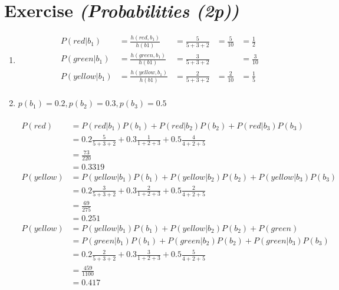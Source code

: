 \documentclass{article}
\author{Sandra Kohl, Jan Hendrik Kirchner, Max Bernhard Ilsen}
\begin{document}
\section{Exercise \textit{(Probabilities (2p))}}
\begin{enumerate}
    \item
        \begin{align*}
            P(red|b_1) &= \frac{h(red,b_1)}{h(b1)} &= \frac{5}{5+3+2} &= \frac{5}{10} &= \frac{1}{2}\\
            P(green|b_1) &= \frac{h(green,b_1)}{h(b1)} &= \frac{3}{5+3+2} &&= \frac{3}{10}\\
            P(yellow|b_1) &= \frac{h(yellow,b_1)}{h(b1)} &= \frac{2}{5+3+2} &= \frac{2}{10} &= \frac{1}{5}\\
        \end{align*}
    \item $p(b_1) = 0.2, p(b_2) = 0.3, p(b_3) = 0.5$\\
        \\
        \begin{align*}
            P(red) &= P(red|b_1)P(b_1) + P(red|b_2)P(b_2)+ P(red|b_3)P(b_3)\\
                   &= 0.2\frac{5}{5+3+2} + 0.3\frac{1}{1+2+3} + 0.5\frac{4}{4+2+5}\\
                   &= \frac{73}{220} \\&= 0.3319\\
            P(yellow) &= P(yellow|b_1)P(b_1) + P(yellow|b_2)P(b_2)+
            P(yellow|b_3)P(b_3)\\
            &= 0.2\frac{3}{5+3+2} + 0.3\frac{2}{1+2+3} + 0.5\frac{2}{4+2+5}\\
            &= \frac{69}{275} \\&= 0.251\\
            P(yellow) &= P(yellow|b_1)P(b_1) + P(yellow|b_2)P(b_2)+
            P(green)\\ &= P(green|b_1)P(b_1) + P(green|b_2)P(b_2)+
            P(green|b_3)P(b_3)\\
            &= 0.2\frac{2}{5+3+2} + 0.3\frac{3}{1+2+3} + 0.5\frac{5}{4+2+5}\\
            &= \frac{459}{1100}\\ &= 0.417\\
        \end{align*}
\end{enumerate}
\end{document}
